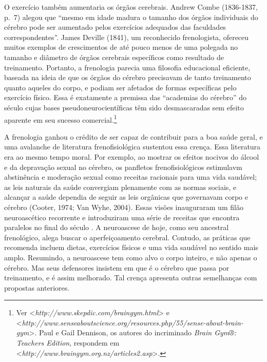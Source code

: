 O exercício também aumentaria os órgãos cerebrais. Andrew Combe
(1836-1837, p.~7) alegou que ``mesmo em idade madura o tamanho dos órgãos
individuais do cérebro pode ser aumentado pelos exercícios adequados das
faculdades correspondentes''. James Deville (1841), um reconhecido
frenologista, ofereceu muitos exemplos de crescimentos de até pouco
menos de uma polegada no tamanho e diâmetro de órgãos cerebrais
específicos como resultado de treinamento. Portanto, a frenologia
parecia uma filosofia educacional eficiente, baseada na ideia de que os
órgãos do cérebro precisavam de tanto treinamento quanto aqueles do
corpo, e podiam ser afetados de formas específicas pelo exercício
físico. Essa é exatamente a premissa das ``academias do cérebro'' do
século  cujas bases pseudoneurocientíficas têm sido desmascaradas sem
efeito aparente em seu sucesso comercial.\footnote[12]{Ver \textless{}\emph{http://www.skepdic.com/braingym.html}\textgreater{} e
\textless{}\emph{http://www.senseaboutscience.org/resources.php/55/sense-about-brain-gym}\textgreater{}.
Paul e Gail Dennison, os autores do incriminado \emph{Brain Gym®:
Teachers Edition}, respondem em
\textless{}\emph{http://www.braingym.org.nz/articles2.asp}\textgreater{}.}

A frenologia ganhou o crédito de ser capaz de contribuir para a boa
saúde geral, e uma avalanche de literatura frenofisiológica sustentou
essa crença. Essa literatura era ao mesmo tempo moral. Por exemplo, ao
mostrar os efeitos nocivos do álcool e da depravação sexual no cérebro,
os panfletos frenofisiológicos estimulavm abstinência e moderação sexual
como receitas racionais para uma vida saudável; as leis naturais da
saúde convergiam plenamente com as normas sociais, e alcançar a saúde
dependia de seguir as leis orgânicas que governavam corpo e cérebro
(Cooter, 1974; Van Wyhe, 2004). Essas visões inauguraram um filão
neuroascético recorrente e introduziram uma série de receitas que
encontra paralelos no final do século . A neuroascese de hoje, como
seu ancestral frenológico, alega buscar o aperfeiçoamento cerebral.
Contudo, as práticas que recomenda incluem dietas, exercícios físicos e
uma vida saudável no sentido mais amplo. Resumindo, a neuroascese tem
como alvo o corpo inteiro, e não apenas o cérebro. Mas seus defensores
insistem em que é o cérebro que passa por treinamento, e é assim
melhorado. Tal crença apresenta outras semelhanças com propostas
anteriores.

